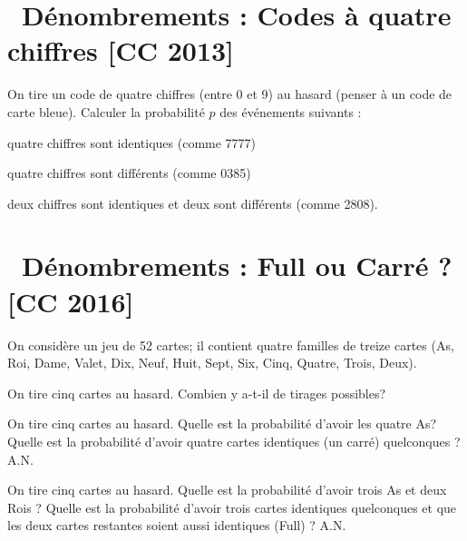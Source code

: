 \documentclass[utf8, 11pt]{feuille}
\begin{document}



\section{\soft~Dénombrements : Codes à quatre chiffres [CC 2013]}

On tire un code de quatre chiffres (entre 0 et 9) au hasard (penser à un code de carte bleue). Calculer la probabilité $p$ des événements suivants :

\medskip

\question
quatre chiffres sont identiques (comme 7777)

\question
quatre chiffres sont différents (comme 0385)

\question
deux chiffres sont identiques et deux sont différents (comme 2808).





\section{\medium~Dénombrements : Full ou Carré ? [CC 2016]}

On considère un jeu de 52 cartes; il contient quatre familles de treize cartes (As, Roi, Dame, Valet, Dix, Neuf, Huit, Sept, Six, Cinq, Quatre,
Trois, Deux).

\medskip

\question
On tire cinq cartes au hasard. Combien y a-t-il de tirages possibles?

\question
On tire cinq cartes au hasard. Quelle est la probabilité d'avoir les quatre As? Quelle est la probabilité d'avoir quatre cartes identiques (un carré) quelconques ? A.N.

\question
On tire cinq cartes au hasard. Quelle est la probabilité d'avoir trois As et deux Rois ? Quelle est la probabilité d'avoir  trois cartes identiques quelconques et que les deux cartes restantes soient aussi identiques (Full) ? A.N.
\end{document}

